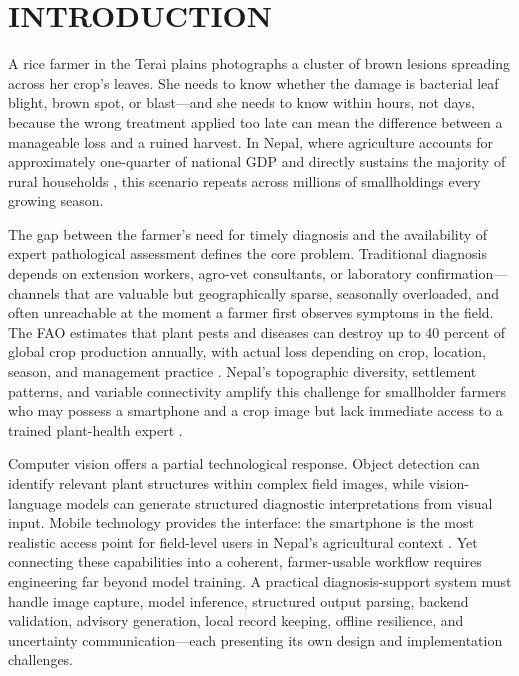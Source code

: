 \chapter{INTRODUCTION}


A rice farmer in the Terai plains photographs a cluster of brown lesions spreading across her
crop's leaves. She needs to know whether the damage is bacterial leaf blight, brown spot, or
blast---and she needs to know within hours, not days, because the wrong treatment applied too
late can mean the difference between a manageable loss and a ruined harvest. In Nepal, where
agriculture accounts for approximately one-quarter of national GDP and directly sustains the
majority of rural households \parencite{moaldAgricultureStats2080,nsoAgricultureCensus2021},
this scenario repeats across millions of smallholdings every growing season.

The gap between the farmer's need for timely diagnosis and the availability of expert
pathological assessment defines the core problem. Traditional diagnosis depends on extension
workers, agro-vet consultants, or laboratory confirmation---channels that are valuable but
geographically sparse, seasonally overloaded, and often unreachable at the moment a farmer
first observes symptoms in the field. The FAO estimates that plant pests and diseases can
destroy up to 40 percent of global crop production annually, with actual loss depending on crop,
location, season, and management practice \parencite{faoPlantHealthLosses}. Nepal's
topographic diversity, settlement patterns, and variable connectivity amplify this challenge
for smallholder farmers who may possess a smartphone and a crop image but lack immediate access
to a trained plant-health expert \parencite{khatriNepalDigitalAgri2023}.

Computer vision offers a partial technological response. Object detection can identify relevant
plant structures within complex field images, while vision-language models can generate
structured diagnostic interpretations from visual input. Mobile technology provides the
interface: the smartphone is the most realistic access point for field-level users in Nepal's
agricultural context \parencite{faoNepalDigitalAgriculture}. Yet connecting these capabilities
into a coherent, farmer-usable workflow requires engineering far beyond model training. A
practical diagnosis-support system must handle image capture, model inference, structured output
parsing, backend validation, advisory generation, local record keeping, offline resilience, and
uncertainty communication---each presenting its own design and implementation challenges.

